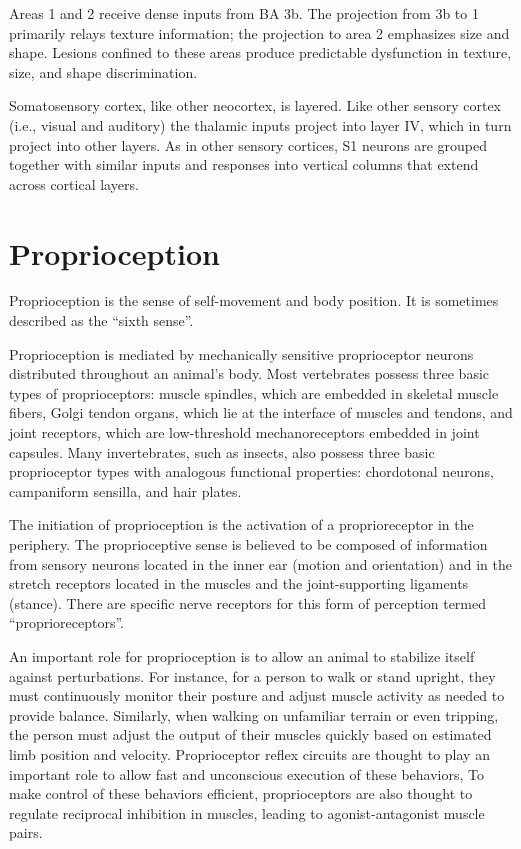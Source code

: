 \documentclass[]{book}
\begin{document}
Areas 1 and 2 receive dense inputs from BA 3b. The projection from 3b to 1 primarily relays texture information; the projection to area 2 emphasizes size and shape. Lesions confined to these areas produce predictable dysfunction in texture, size, and shape discrimination.

Somatosensory cortex, like other neocortex, is layered. Like other sensory cortex (i.e., visual and auditory) the thalamic inputs project into layer IV, which in turn project into other layers. As in other sensory cortices, S1 neurons are grouped together with similar inputs and responses into vertical columns that extend across cortical layers.

\hypertarget{proprioception}{%
\section{Proprioception}\label{proprioception}}

Proprioception is the sense of self-movement and body position. It is sometimes described as the ``sixth sense''.

Proprioception is mediated by mechanically sensitive proprioceptor neurons distributed throughout an animal's body. Most vertebrates possess three basic types of proprioceptors: muscle spindles, which are embedded in skeletal muscle fibers, Golgi tendon organs, which lie at the interface of muscles and tendons, and joint receptors, which are low-threshold mechanoreceptors embedded in joint capsules. Many invertebrates, such as insects, also possess three basic proprioceptor types with analogous functional properties: chordotonal neurons, campaniform sensilla, and hair plates.

The initiation of proprioception is the activation of a proprioreceptor in the periphery. The proprioceptive sense is believed to be composed of information from sensory neurons located in the inner ear (motion and orientation) and in the stretch receptors located in the muscles and the joint-supporting ligaments (stance). There are specific nerve receptors for this form of perception termed ``proprioreceptors''.

An important role for proprioception is to allow an animal to stabilize itself against perturbations. For instance, for a person to walk or stand upright, they must continuously monitor their posture and adjust muscle activity as needed to provide balance. Similarly, when walking on unfamiliar terrain or even tripping, the person must adjust the output of their muscles quickly based on estimated limb position and velocity. Proprioceptor reflex circuits are thought to play an important role to allow fast and unconscious execution of these behaviors, To make control of these behaviors efficient, proprioceptors are also thought to regulate reciprocal inhibition in muscles, leading to agonist-antagonist muscle pairs.
\end{document}
